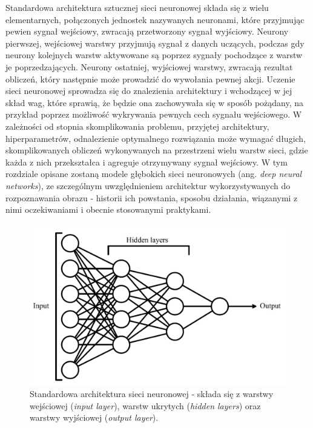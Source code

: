 \documentclass[12pt,a4paper,twoside]{article}
\begin{document}
Standardowa architektura sztucznej sieci neuronowej składa się z wielu elementarnych, połączonych jednostek nazywanych neuronami, które przyjmując pewien sygnał wejściowy, zwracają przetworzony sygnał wyjściowy. Neurony pierwszej, wejściowej warstwy przyjmują sygnał z danych uczących, podczas gdy neurony kolejnych warstw aktywowane są poprzez sygnały pochodzące z warstw je poprzedzających. Neurony ostatniej, wyjściowej warstwy, zwracają rezultat obliczeń, który następnie może prowadzić do wywołania pewnej akcji. Uczenie sieci neuronowej sprowadza się do znalezienia architektury i wchodzącej w jej skład wag, które sprawią, że będzie ona zachowywała się w sposób pożądany, na przykład poprzez możliwość wykrywania pewnych cech sygnału wejściowego. W zależności od stopnia skomplikowania problemu, przyjętej architektury, hiperparametrów, odnalezienie optymalnego rozwiązania może wymagać długich, skomplikowanych obliczeń wykonywanych na przestrzeni wielu warstw sieci, gdzie każda z nich przekształca i agreguje otrzymywany sygnał wejściowy. W tym rozdziale opisane zostaną modele głębokich sieci neuronowych (ang. \textit{deep neural networks}), ze szczególnym uwzględnieniem architektur wykorzystywanych do rozpoznawania obrazu - historii ich powstania, sposobu działania, wiązanymi z nimi oczekiwaniami i obecnie stosowanymi praktykami.

\begin{figure}[h]
  \centering
\includegraphics[scale=0.5]{../obrazy/fig:NN.png}
\caption{Standardowa architektura sieci neuronowej - składa się z warstwy wejściowej (\textit{input layer}), warstw ukrytych (\textit{hidden layers}) oraz warstwy wyjściowej  (\textit{output layer}).
\label{fig:NN}}
\end{figure}
\end{document}
